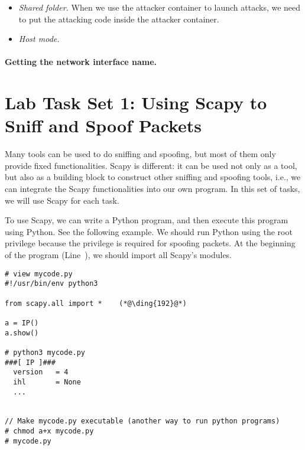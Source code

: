 \begin{itemize}
\item \textit{Shared folder.} When we use the attacker container
to launch attacks, we need to put the attacking code inside
the attacker container.



\item \textit{Host mode.}

\end{itemize}


\paragraph{Getting the network interface name.}




\section{Lab Task Set 1: Using Scapy to Sniff and Spoof Packets}


Many tools can be used to do sniffing and spoofing, but most of them only provide 
fixed functionalities. Scapy is different: it can be used not only as a tool, 
but also as a building block to construct other sniffing and spoofing
tools, i.e., we can integrate the Scapy functionalities into our own
program.  In this set of tasks, we will use Scapy for each task. 


To use Scapy, we can write a Python program, and then execute this program
using Python. See the following example. We should run Python using the 
root privilege because the privilege is required for spoofing packets. 
At the beginning of the program (Line~), 
we should import all Scapy's modules.

\begin{lstlisting}
# view mycode.py
#!/usr/bin/env python3

from scapy.all import *    (*@\ding{192}@*)

a = IP()
a.show()

# python3 mycode.py
###[ IP ]###
  version   = 4
  ihl       = None
  ...


// Make mycode.py executable (another way to run python programs)
# chmod a+x mycode.py
# mycode.py 
\end{lstlisting}


